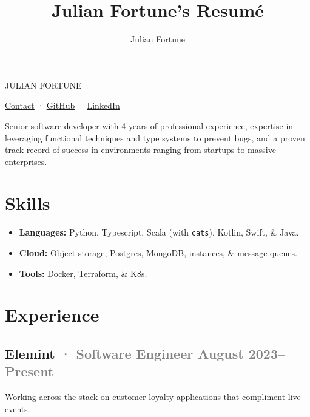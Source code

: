 \documentclass[12pt]{article} %
\title{Julian Fortune's Resumé}
\author{Julian Fortune}
\let\defaultref\href
\renewcommand{\href}[2]{%
  \defaultref{#1}{\ul{#2}}%
}
\newcommand{\link}[2]{\href{#1}{#2}}
\renewcommand{\emph}[1]{%
  \textcolor{gray}{#1}%
}
\def\separator{ · {}}
\begin{document}
\begin{bfseries}\begin{huge}
  {\selectfont%
    \MakeTextUppercase{Julian Fortune}
  }
\end{huge}\end{bfseries}

  \link{https://julianfortune.com}{Contact}\separator%
    \link{http://github.com/julianfortune}{GitHub}\separator%
\link{http://linkedin.com/in/julianfortune}{LinkedIn}%


\vspace{0.5em}

Senior software developer with 4 years of professional experience,
expertise in leveraging functional techniques and type systems to
prevent bugs, and a proven track record of success in environments
ranging from startups to massive enterprises.

\hypertarget{skills}{%
\section{Skills}\label{skills}}

\begin{itemize}
\item
  \textbf{Languages:} Python, Typescript, Scala (with \texttt{cats}),
  Kotlin, Swift, \& Java.
\item
  \textbf{Cloud:} Object storage, Postgres, MongoDB, instances, \&
  message queues.
\item
  \textbf{Tools:} Docker, Terraform, \& K8s.
\end{itemize}

\hypertarget{experience}{%
\section{Experience}\label{experience}}

\hypertarget{elemint-software-engineer-august-2023present}{%
\subsection{\texorpdfstring{Elemint \emph{· \small Software Engineer
\hfill August
2023--Present}}{Elemint · Software Engineer August 2023--Present}}\label{elemint-software-engineer-august-2023present}}

Working across the stack on customer loyalty applications that
compliment live events.
\end{document}
